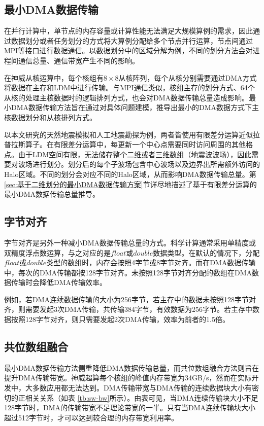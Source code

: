 \documentclass[degree=doctor]{thuthesis}
\begin{document}
\subsection{最小DMA数据传输}

在并行计算中，单节点的内存容量或计算性能无法满足大规模算例的需求，因此通过数据划分或者任务划分的方式将大算例分配给多个节点并行运算，节点间通过MPI等接口进行数据通信。以数据划分中的区域分解为例，不同的划分方法会对进程间通信总量、通信带宽产生不同的影响。

在神威从核运算中，每个核组有$8\times8$从核阵列，每个从核分别需要通过DMA方式将数据在主存和LDM中进行传输。与MPI通信类似，核组主存的划分方式、64个从核的处理主核数据时的逻辑排列方式，也会对DMA数据传输总量造成影响。最小DMA数据传输方法旨在通过对具体问题建模，推导出最小的DMA数据方式下主核数据划分和从核排列方式。

以本文研究的天然地震模拟和人工地震勘探为例，两者皆使用有限差分运算近似拉普拉斯算子。在有限差分运算中，每更新一个中心点需要同时访问周围的其他格点。由于LDM空间有限，无法储存整个二维或者三维数组（地震波波场），因此需要对波场进行划分。划分后的每个子波场包含中心波场以及边界出所需额外访问的Halo区域。不同的划分会对应不同的Halo区域，从而影响DMA数据传输总量。第\ref{sec:基于二维划分的最小DMA数据传输方案}节详尽地描述了基于有限差分运算的最小DMA数据传输总量推导。


\subsection{字节对齐}

字节对齐是另外一种减小DMA数据传输总量的方式。科学计算通常采用单精度或双精度浮点数运算，与之对应的是$float$或$double$数据类型。在默认的情况下，分配$float$或$double$类型的数组时，内存会按照4字节或8字节对齐。而在DMA数据传输中，每次的DMA传输都按128字节对齐。未按照128字节对齐分配的数组在DMA数据传输时会降低DMA传输效率。

例如，若DMA连续数据传输的大小为256字节，若主存中的数据未按照128字节对齐，则需要发起3次DMA传输，共传输384字节，有效数据为256字节。若主存中数据按照128字节对齐，则只需要发起2次DMA传输，效率为前者的1.5倍。

\subsection{共位数组融合}

最小DMA数据传输方法侧重降低DMA数据传输总量，而共位数组融合方法则旨在提升DMA传输带宽。神威超算每个核组的峰值内存带宽为34GB/s，然而在实际开发中，大多数应用都无法达到。DMA传输带宽与DMA传输的连续数据块大小有密切的正相关关系（如表
\ref{tb:sw-bw}所示）。由表可见，当DMA连续传输块大小不足128字节时，DMA的传输带宽不足理论带宽的一半。只有当DMA连续传输块大小超过512字节时，才可以达到较合理的内存带宽利用率。
\end{document}
